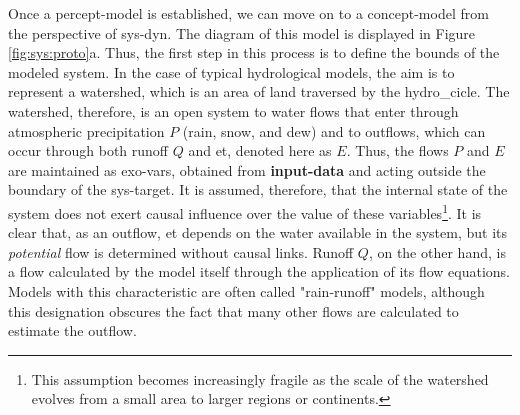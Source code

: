 \documentclass[./main_en.tex]{subfiles}
\begin{document}
\par Once a \gls{percept-model} is established, we can move on to a \gls{concept-model} from the perspective of \gls{sys-dyn}. The diagram of this \gls{model} is displayed in Figure \ref{fig:sys:proto}a. Thus, the first step in this process is to define the \gls{bounds} of the modeled system. In the case of typical hydrological models, the aim is to represent a watershed, which is an area of land traversed by the \gls{hydro_cicle}. The watershed, therefore, is an open \gls{system} to water flows that enter through atmospheric precipitation $P$ (rain, snow, and dew) and to outflows, which can occur through both runoff $Q$ and \acrlong{et}, denoted here as $E$. Thus, the flows $P$ and $E$ are maintained as \gls{exo-vars}, obtained from \textbf{\gls{input-data}} and acting outside the boundary of the \gls{sys-target}. It is assumed, therefore, that the internal state of the \gls{system} does not exert causal influence over the value of these variables\footnote{This assumption becomes increasingly fragile as the scale of the watershed evolves from a small area to larger regions or continents.}. It is clear that, as an outflow, \acrlong{et} depends on the water available in the \gls{system}, but its \textit{potential} flow is determined without causal links. Runoff $Q$, on the other hand, is a flow calculated by the \gls{model} itself through the application of its flow equations. Models with this characteristic are often called "rain-runoff" models, although this designation obscures the fact that many other flows are calculated to estimate the outflow.
\end{document}
